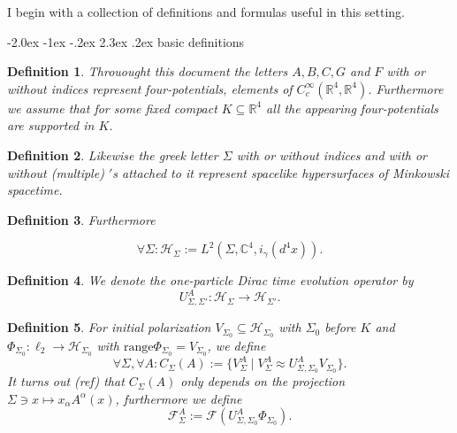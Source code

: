 \documentclass[oneside,reqno,12pt]{amsart}
\makeatletter
\newtheorem{Def}{Definition}[section]
\renewcommand\section{\@startsection {section}{1}{\z@}%
                                   {-2.0ex \@plus -1ex \@minus -.2ex}%
                                   {2.3ex \@plus.2ex}%
                                   {\normalfont\Large\bfseries}}
\makeatother
\begin{document}
I begin with a collection of definitions and formulas useful in this setting.

\section{basic definitions}
\begin{Def}
Throuought this document the letters \(A,B,C,G\) and \(F\) with or without indices represent four-potentials,  elements of \(C_c^\infty(\mathbb{R}^4, \mathbb{R}^4)\). Furthermore we assume that for some fixed compact \(K\subseteq \mathbb{R}^4\) all the appearing four-potentials are supported in \(K\).
\end{Def}
\begin{Def}
Likewise the greek letter \(\Sigma\) with or without indices and with or without (multiple) \('\)s attached to it represent spacelike hypersurfaces of Minkowski spacetime.
\end{Def}

\begin{Def}
Furthermore

\begin{equation}
\forall \Sigma: \mathcal{H}_\Sigma:= L^2(\Sigma, \mathbb{C}^4, i_\gamma(d^4x)).
\end{equation}
\end{Def}

\begin{Def}
We denote the one-particle Dirac time evolution operator by
\begin{equation}
U^A_{\Sigma, \Sigma'} : \mathcal{H}_\Sigma\rightarrow \mathcal{H}_{\Sigma'}.
\end{equation}
\end{Def}

\begin{Def}
For initial polarization \(V_{\Sigma_0}\subseteq \mathcal{H}_{\Sigma_0}\) with \(\Sigma_0\) before \(K\) and \(\Phi_{\Sigma_0}: \ell_2\rightarrow \mathcal{H}_{\Sigma_0}\) with \(\text{range}\Phi_{\Sigma_0}=V_{\Sigma_0}\), we define
\begin{equation}
\forall \Sigma, \forall A: C_{\Sigma}(A):=\{V_\Sigma^A\mid V_\Sigma^A \approx U^A_{\Sigma, \Sigma_0} V_{\Sigma_0}\}.
\end{equation}
It turns out (ref) that \(C_{\Sigma}(A)\) only depends on the projection \(\Sigma\ni x\mapsto x_\alpha A^\alpha(x)\), furthermore we define
\begin{equation}
\mathcal{F}_{\Sigma}^A:=\mathcal{F}( U_{\Sigma, \Sigma_0}^A\Phi_{\Sigma_0}).
\end{equation}
\end{Def}
\end{document}
